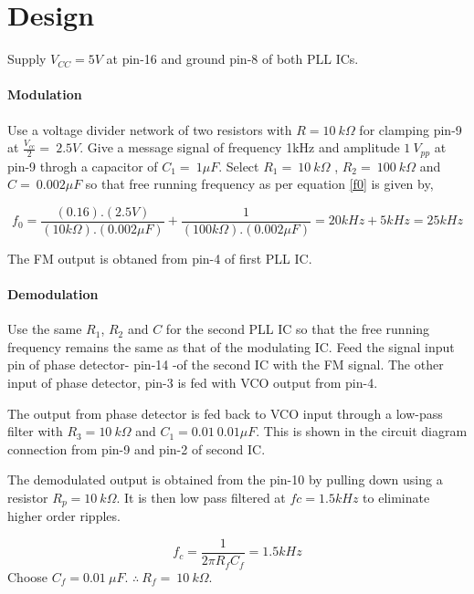 \section*{Design}

Supply $V_{CC}=5V$ at pin-16 and ground pin-8 of both  PLL ICs.

\paragraph{Modulation}

Use a voltage divider network of two resistors with $ R=10\ k\Omega$  for clamping pin-9 at $\frac{V_{cc}}{2}=\ 2.5V$. 
Give a message signal of frequency 1kHz and amplitude  $1\ V_{pp}$ at pin-9 throgh a capacitor of $C_1=\ 1\mu F$.
Select $R_1=\ 10\ k\Omega$ ,   $R_2=\ 100\ k\Omega$ and $C=\  0.002 \mu F$ so that free running frequency as per equation \ref{f0} is given by,

\begin{equation}
f_0 =\frac{(0.16 ). (2.5V)}{(10k\Omega).(0.002\mu F)}+\frac{1}{(100k\Omega).(0.002\mu F)}=20 kHz+5 kHz=25 kHz
\end{equation}
 
The FM output is obtaned from pin-4 of first PLL IC.

\paragraph{Demodulation}

Use the same $R_1$, $R_2$ and $C$ for the second PLL IC so that the free running frequency remains the same as that of the modulating IC. 
Feed the signal input pin of phase detector- pin-14 -of the second IC with the FM signal. The other input of phase detector, pin-3 is fed with VCO output from pin-4.

The output from phase detector is fed back to  VCO input through a low-pass filter with $R_3=10\ k\Omega$ and $C_1=0.01\ 0.01\mu F$. This is shown in the circuit diagram connection from pin-9 and pin-2 of second IC.

The demodulated output is obtained from the pin-10 by pulling down using a resistor $R_p=10 \ k\Omega$. It is then low pass filtered at $fc=1.5 kHz$ to eliminate higher order ripples.

\begin{equation}
f_c=\frac{1}{2\pi R_fC_f}=1.5kHz
\end{equation}
Choose $C_f=0.01\ \mu F$.  $\therefore \ R_f=\ 10 \ k\Omega$.
